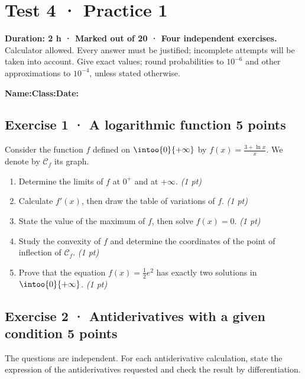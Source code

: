 \mxnewpage{}\label{sujet:6-1}

\section*{Test 4 · Practice 1}


\textbf{Duration: 2 h · Marked out of 20 · Four independent exercises.}\\Calculator allowed. Every answer must be justified; incomplete attempts will be taken into account. Give exact values; round probabilities to $10^{-6}$ and other approximations to $10^{-4}$, unless stated otherwise.

\smallskip\textbf{Name:}\enspace\dotfill\quad\textbf{Class:}\enspace\dotfill\quad\textbf{Date:}\enspace\dotfill

\subsection*{Exercise 1 · A logarithmic function \hfill 5 points}Consider the function $f$ defined on $\intoo{0}{+\infty}$ by $f(x)=\frac{3+\ln x}x$. We denote by $\mathcal C_f$ its graph.

\begin{enumerate}

\item Determine the limits of $f$ at $0^+$ and at $+\infty$. \hfill\textit{(1 pt)}

\item Calculate $f' (x)$, then draw the table of variations of $f$. \hfill\textit{(1 pt)}

\item State the value of the maximum of $f$, then solve $f(x)=0$. \hfill\textit{(1 pt)}

\item Study the convexity of $f$ and determine the coordinates of the point of inflection of $\mathcal C_f$. \hfill\textit{(1 pt)}

\item Prove that the equation $f(x)=\frac12 e^{2}$ has exactly two solutions in $\intoo{0}{+\infty}$. \hfill\textit{(1 pt)}

\end{enumerate}

\subsection*{Exercise 2 · Antiderivatives with a given condition \hfill 5 points}The  questions are independent. For each antiderivative calculation, state the expression of the antiderivatives requested and check the result by differentiation.

